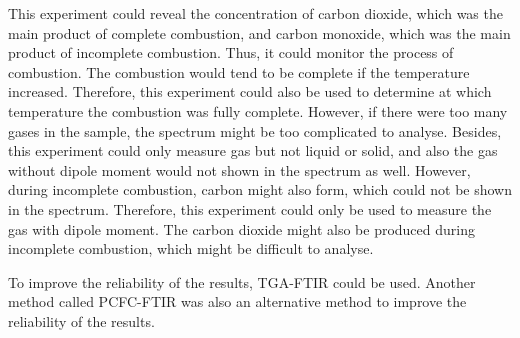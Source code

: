 \documentclass[twocolumn]{article} %
\begin{document}
This experiment could reveal the concentration of carbon dioxide, which was the main product of complete combustion, and carbon monoxide, which was the main product of incomplete combustion. Thus, it could monitor the process of combustion. The combustion would tend to be complete if the temperature increased. Therefore, this experiment could also be used to determine at which temperature the combustion was fully complete.\cite{FTIR} However, if there were too many gases in the sample, the spectrum might be too complicated to analyse. Besides, this experiment could only measure gas but not liquid or solid, and also the gas without dipole moment would not shown in the spectrum as well. However, during incomplete combustion, carbon might also form, which could not be shown in the spectrum. Therefore, this experiment could only be used to measure the gas with dipole moment. The carbon dioxide might also be produced during incomplete combustion, which might be difficult to analyse. 

To improve the reliability of the results, TGA-FTIR could be used.\cite{TGA} Another method called PCFC-FTIR was also an alternative method to improve the reliability of the results.\cite{PCFC}











\end{document}
